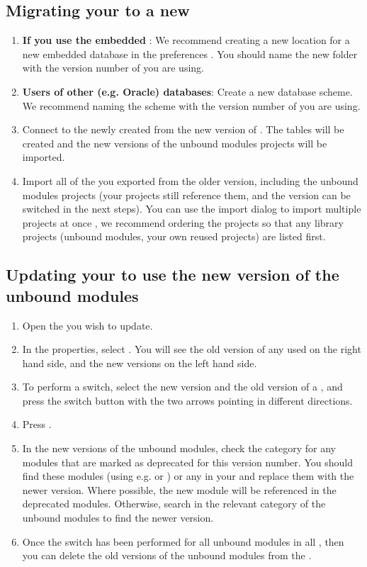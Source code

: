 \subsection{Migrating your \gdprojects{} to a new \gddb{}}
\begin{enumerate}
\item \textbf{If you use the embedded \gddb{}}: We recommend creating a new location for a new embedded database in the preferences . You should name the new folder with the version number of \app{} you are using. 
\item \textbf{Users of other (e.g. Oracle) databases}: Create a new database scheme. We recommend naming the scheme with the version number of \app{} you are using. 
\item Connect to the newly created \gddb{} from the new version of \app{}. The \gddb{} tables will be created and the new versions of the unbound modules projects will be imported.  
\item Import all of the \gdprojects{} you exported from the older version, including the unbound modules projects (your projects still reference them, and the version can be switched in the next steps). You can use the import dialog to import multiple projects at once , we recommend ordering the projects so that any library projects (unbound modules, your own reused projects) are listed first.
\end{enumerate}

\subsection{Updating your \gdprojects{} to use the new version of the unbound modules}
\begin{enumerate}
\item Open the \gdproject{} you wish to update.
\item In the \gdproject{} properties, select . You will see the old version of any used \gdprojects{} on the right hand side, and the new versions on the left hand side.
\item To perform a switch, select the new version and the old version of a \gdproject{}, and press the switch button with the two arrows pointing in different directions.
\item Press . 
\item In the new versions of the unbound modules, check the category  for any modules that are marked as deprecated for this version number. You should find these modules (using e.g.  or ) or any \gdsteps{} in your \gdproject{} and replace them with the newer version. Where possible, the new module will be referenced in the deprecated modules. Otherwise, search in the relevant category of the unbound modules to find the newer version. 
\item Once the switch has been performed for all unbound modules in all \gdprojects{}, then you can delete the old versions of the unbound modules from the \gddb{}. 
\end{enumerate}

